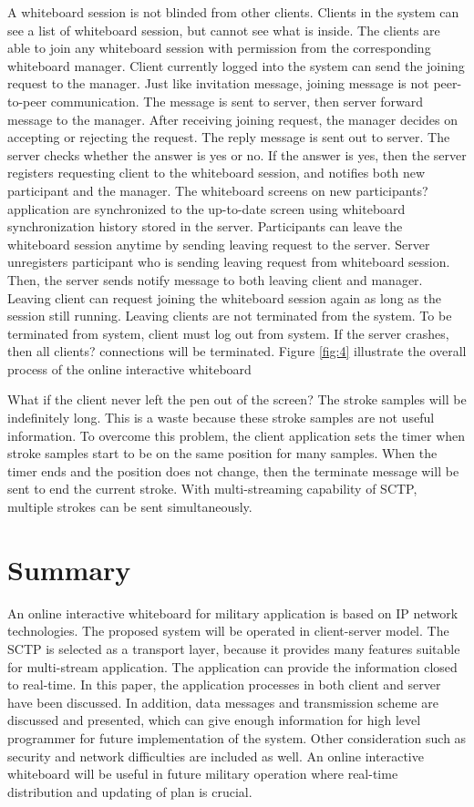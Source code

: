 \documentclass[conference]{IEEEtran}
\begin{document}
A whiteboard session is not blinded from other clients. Clients in the system can see a list of whiteboard session, but cannot see what is inside. The clients are able to join any whiteboard session with permission from the corresponding whiteboard manager. Client currently logged into the system can send the joining request to the manager. Just like invitation message, joining message is not peer-to-peer communication. The message is sent to server, then server forward message to the manager. After receiving joining request, the manager decides on accepting or rejecting the request. The reply message is sent out to server. The server checks whether the answer is yes or no. If the answer is yes, then the server registers requesting client to the whiteboard session, and notifies both new participant and the manager. The whiteboard screens on new participants? application are synchronized to the up-to-date screen using whiteboard synchronization history stored in the server.
Participants can leave the whiteboard session anytime by sending leaving request to the server. Server unregisters participant who is sending leaving request from whiteboard session. Then, the server sends notify message to both leaving client and manager. Leaving client can request joining the whiteboard session again as long as the session still running. Leaving clients are not terminated from the system. To be terminated from system, client must log out from system. If the server crashes, then all clients? connections will be terminated. Figure \ref{fig:4} illustrate the overall process of the online interactive whiteboard

What if the client never left the pen out of the screen? The stroke samples will be indefinitely long. This is a waste because these stroke samples are not useful information. To overcome this problem, the client application sets the timer when stroke samples start to be on the same position for many samples. When the timer ends and the position does not change, then the terminate message will be sent to end the current stroke. With multi-streaming capability of SCTP, multiple strokes can be sent simultaneously.

\section{Summary}
An online interactive whiteboard for military application is based on IP network technologies. 
The proposed system will be operated in client-server model. 
The SCTP is selected as a transport layer, because it provides many features suitable for multi-stream application. 
The application can provide the information closed to real-time. 
In this paper, the application processes in both client and server have been discussed. 
In addition, data messages and transmission scheme are discussed and presented, which can give enough information for high level programmer for future implementation of the system. 
Other consideration such as security and network difficulties are included as well. 
An online interactive whiteboard will be useful in future military operation where real-time distribution and updating of plan is crucial.
\end{document}
